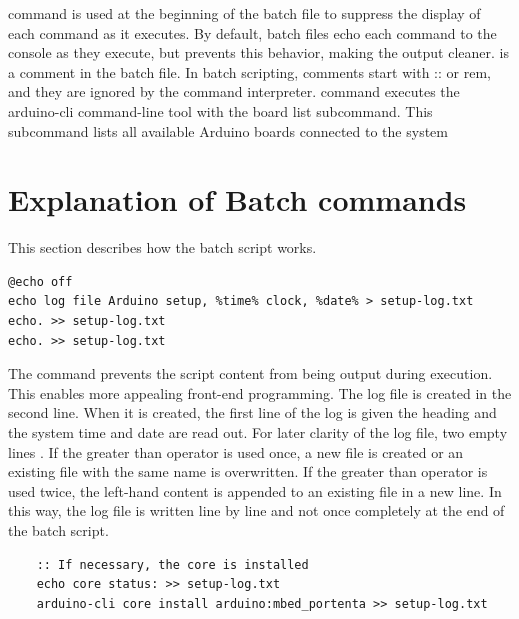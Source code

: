  command is used at the beginning of the batch file to suppress the display of each command as it executes. By default, batch files echo each command to the console as they execute, but  prevents this behavior, making the output cleaner. 
 is a comment in the batch file. In batch scripting, comments start with :: or rem, and they are ignored by the command interpreter.
 command executes the arduino-cli command-line tool with the board list subcommand. This subcommand lists all available Arduino boards connected to the system

\section{Explanation of Batch commands}

This section describes how the batch script works.

{\small 
\begin{lstlisting}
@echo off
echo log file Arduino setup, %time% clock, %date% > setup-log.txt
echo. >> setup-log.txt
echo. >> setup-log.txt
\end{lstlisting}
}

The command  prevents the script content from being output during execution. This enables more appealing front-end programming. The log file is created in the second line. When it is created, the first line of the log is given the heading  and the system time  and date  are read out. For later clarity of the log file, two empty lines . If the greater than operator  is used once, a new file is created or an existing file with the same name is overwritten. If the greater than operator  is used twice, the left-hand content is appended to an existing file in a new line. In this way, the log file is written line by line and not once completely at the end of the batch script.

\begin{center}
\begin{lstlisting}
	:: If necessary, the core is installed
	echo core status: >> setup-log.txt
	arduino-cli core install arduino:mbed_portenta >> setup-log.txt
\end{lstlisting}
\end{center}

